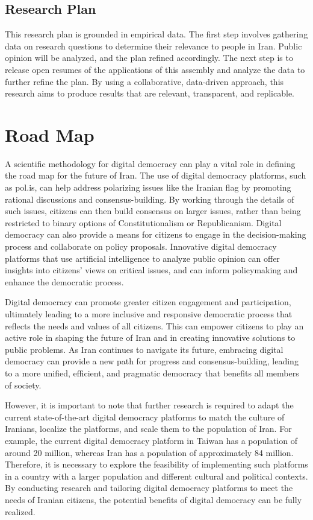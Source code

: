 \documentclass{IEEEtran}
\begin{document}
\subsection{Research Plan}
This research plan is grounded in empirical data. The first step involves gathering data on research questions to determine their relevance to people in Iran. Public opinion will be analyzed, and the plan refined accordingly. The next step is to release open resumes of the applications of this assembly and analyze the data to further refine the plan.
By using a collaborative, data-driven approach, this research aims to produce results that are relevant, transparent, and replicable.


\section{Road Map}

A scientific methodology for digital democracy can play a vital role in defining the road map for the future of Iran. The use of digital democracy platforms, such as pol.is, can help address polarizing issues like the Iranian flag by promoting rational discussions and consensus-building. By working through the details of such issues, citizens can then build consensus on larger issues, rather than being restricted to binary options of Constitutionalism or Republicanism.
Digital democracy can also provide a means for citizens to engage in the decision-making process and collaborate on policy proposals. Innovative digital democracy platforms that use artificial intelligence to analyze public opinion can offer insights into citizens' views on critical issues, and can inform policymaking and enhance the democratic process.

Digital democracy can promote greater citizen engagement and participation, ultimately leading to a more inclusive and responsive democratic process that reflects the needs and values of all citizens. This can empower citizens to play an active role in shaping the future of Iran and in creating innovative solutions to public problems.
As Iran continues to navigate its future, embracing digital democracy can provide a new path for progress and consensus-building, leading to a more unified, efficient, and pragmatic democracy that benefits all members of society.

However, it is important to note that further research is required to adapt the current state-of-the-art digital democracy platforms to match the culture of Iranians, localize the platforms, and scale them to the population of Iran. For example, the current digital democracy platform in Taiwan has a population of around 20 million, whereas Iran has a population of approximately 84 million. Therefore, it is necessary to explore the feasibility of implementing such platforms in a country with a larger population and different cultural and political contexts. By conducting research and tailoring digital democracy platforms to meet the needs of Iranian citizens, the potential benefits of digital democracy can be fully realized.
\end{document}
